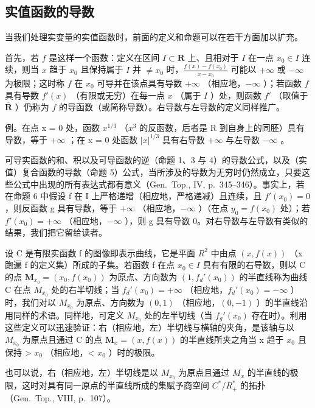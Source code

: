 \subsection{实值函数的导数}

当我们处理实变量的实值函数时，前面的定义和命题可以在若干方面加以扩充。

首先，若 \(f\) 是这样一个函数：定义在区间 \(I \subset \mathbf{R}\) 上、且相对于 \(I\) 在一点 \(x_0 \in I\) 连续，则当 \(x\) 趋于 \(x_0\) 且保持属于 \(I\) 并 \(\neq x_0\) 时，\(\frac{f(x) - f(x_0)}{x - x_0}\) 可能以 \(+\infty\) 或 \(-\infty\) 为极限；这时称 \(f\) 在 \(x_0\) 可导并在该点具有导数 \(+\infty\) （相应地，\(-\infty\) ）；若函数 \(f\) 具有导数 \(f'(x)\) （有限或无穷）在每一点 \(x\) （属于 \(I\) ）处，则函数 \(f'\) （取值于 \(\overline{\mathbf{R}}\) ）仍称为 \(f\) 的导函数（或简称导数）。右导数与左导数的定义同样推广。

例。在点 x = 0 处，函数 \(x^{1/3}\) （\(x^{3}\) 的反函数，后者是 R 到自身上的同胚）具有导数，等于 \(+\infty\) ；在 x = 0 处函数 \(|x|^{1/3}\) 具有右导数 \(+\infty\) 与左导数 \(-\infty\) 。

可导实函数的和、积以及可导函数的逆（命题 1、3 与 4）的导数公式，以及（实值）复合函数的导数（命题 5）公式，当所涉及的导数为无穷时仍然成立，只要这些公式中出现的所有表达式都有意义（Gen.~Top., IV, p.~345--346）。事实上，若在命题 6 中假设 f 在 I 上严格递增（相应地，严格递减）且连续，且 \(f'(x_{0}) = 0\) ，则反函数 g 具有导数，等于 \(+\infty\) （相应地，\(-\infty\) ）（在点 \(y_{0} = f(x_{0})\) 处）；若 \(f'(x_{0}) = +\infty\) （相应地，\(-\infty\) ），则 g 具有导数 0。对右导数与左导数有类似的结果，我们把它留给读者。

设 C 是有限实函数 f 的图像即表示曲线，它是平面 \(R^{2}\) 中由点 \((x, f(x))\) （x 跑遍 f 的定义集）所成的子集。若函数 f 在点 \(x_{0} \in I\) 具有有限的右导数，则以 C 的点 \(\mathbf{M}_{x_{0}} = (x_{0}, f(x_{0}))\) 为原点、方向数为 \((1, f_{d}'(x_{0}))\) 的半直线称为曲线 C 在点 \(M_{x_{0}}\) 处的右半切线；当 \(f_{d}'(x_{0}) = +\infty\) （相应地，\(f_{d}'(x_{0}) = -\infty\) ）时，我们对以 \(M_{x_{0}}\) 为原点、方向数为 \((0, 1)\) （相应地，\((0, -1)\) ）的半直线沿用同样的术语。同样地，可定义 \(M_{x_{0}}\) 处的左半切线（当 \(f_{g}'(x_{0})\) 存在时）。利用这些定义可以迅速验证：右（相应地，左）半切线与横轴的夹角，是该轴与以 \(M_{x_{0}}\) 为原点且通过 C 的点 \(\mathbf{M}_{x} = (x, f(x))\) 的半直线所夹之角当 x 趋于 \(x_{0}\) 且保持 \textgreater{} \(x_{0}\) （相应地，\textless{} \(x_{0}\) ）时的极限。

也可以说，右（相应地，左）半切线是以 \(M_{x_{0}}\) 为原点且通过 \(M_{x}\) 的半直线的极限，这时对具有同一原点的半直线所成的集赋予商空间 \(C^{*}/R_{+}^{*}\) 的拓扑（Gen.~Top., VIII, p.~107）。

